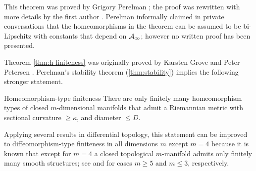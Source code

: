 This theorem was proved by Grigory Perelman \cite{perelman1991};
the proof was rewritten with more details by the first author \cite{kapovitch}.
Perelman  informally claimed in private conversations that the homeomorphisms in the theorem can be assumed to be bi-Lipschitz with constants that depend on $\mathcal{A}_\infty$;
however no written proof has been presented.

Theorem \ref{thm:h-finiteness} was originally proved by Karsten Grove and Peter Petersen \cite{grove-petersen1988}.
Perelman's stability theorem (\ref{thm:stability}) implies the following stronger statement.

\begin{thm}{Homeomorphism-type finiteness}
There are only finitely many homeomorphism types of closed $m$-dimensional manifolds that admit a Riemannian metric with sectional curvature $\ge \kappa$, and diameter $\le D$.
\end{thm}

Applying several results in differential topology, this statement can be improved to diffeomorphism-type finiteness in all dimensions $m$ except $m=4$ because it is known that except for $m=4$ a closed topological $m$-manifold admits only finitely many smooth structures; see \cite{kirby-siebenmann} and  \cite{moise,thurston} for cases $m\ge 5$ and $m\le 3$, respectively.


